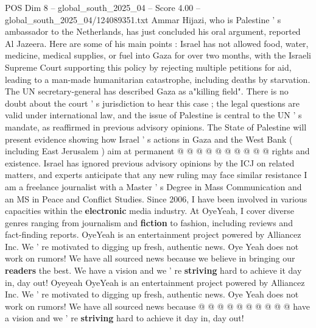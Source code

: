 \begin{textsample}{POS Dim 8 – global\_south\_2025\_04 – Score 4.00 – global\_south\_2025\_04/124089351.txt}
Ammar Hijazi, who is Palestine ' s ambassador to the Netherlands, has just concluded his oral argument, reported Al Jazeera.
Here are some of his main points : Israel has not allowed food, water, medicine, medical supplies, or fuel into Gaza for over two months, with the Israeli Supreme Court supporting this policy by rejecting multiple petitions for aid, leading to a man-made humanitarian catastrophe, including deaths by starvation.
The UN secretary-general has described Gaza as a"killing field".
There is no doubt about the court ' s jurisdiction to hear this case ; the legal questions are valid under international law, and the issue of Palestine is central to the UN ' s mandate, as reaffirmed in previous advisory opinions.
The State of Palestine will present evidence showing how Israel ' s actions in Gaza and the West Bank ( including East Jerusalem ) aim at permanent @ @ @ @ @ @ @ @ @ @ rights and existence.
Israel has ignored previous advisory opinions by the ICJ on related matters, and experts anticipate that any new ruling may face similar resistance I am a freelance journalist with a Master ' s Degree in Mass Communication and an MS in Peace and Conflict Studies.
Since 2006, I have been involved in various capacities within the \textbf{electronic} media industry.
At OyeYeah, I cover diverse genres ranging from journalism and \textbf{fiction} to fashion, including reviews and fact-finding reports.
OyeYeah is an entertainment project powered by Alliancez Inc.
We ' re motivated to digging up fresh, authentic news.
Oye Yeah does not work on rumors!
We have all sourced news because we believe in bringing our \textbf{readers} the best.
We have a vision and we ' re \textbf{striving} hard to achieve it day in, day out!
Oyeyeah OyeYeah is an entertainment project powered by Alliancez Inc.
We ' re motivated to digging up fresh, authentic news.
Oye Yeah does not work on rumors!
We have all sourced news because @ @ @ @ @ @ @ @ @ @ have a vision and we ' re \textbf{striving} hard to achieve it day in, day out!

\end{textsample}
